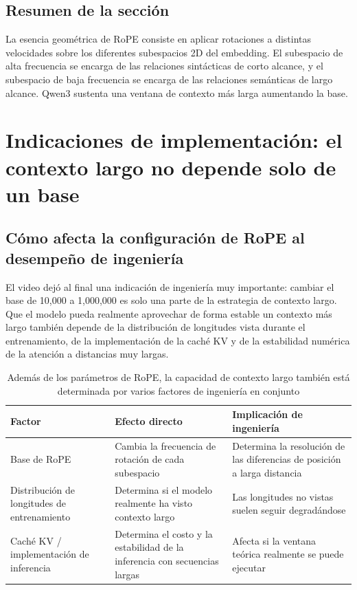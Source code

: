 \documentclass[a4paper]{article}
\begin{document}
\subsection{Resumen de la sección}

La esencia geométrica de RoPE consiste en aplicar rotaciones a distintas velocidades sobre los diferentes subespacios 2D del embedding. El subespacio de alta frecuencia se encarga de las relaciones sintácticas de corto alcance, y el subespacio de baja frecuencia se encarga de las relaciones semánticas de largo alcance. Qwen3 sustenta una ventana de contexto más larga aumentando la base.
\section{Indicaciones de implementación: el contexto largo no depende solo de un base}
\subsection{Cómo afecta la configuración de RoPE al desempeño de ingeniería}
El video dejó al final una indicación de ingeniería muy importante: cambiar el base de 10,000 a 1,000,000 es solo una parte de la estrategia de contexto largo. Que el modelo pueda realmente aprovechar de forma estable un contexto más largo también depende de la distribución de longitudes vista durante el entrenamiento, de la implementación de la caché KV y de la estabilidad numérica de la atención a distancias muy largas.

\begin{table}[H]
\centering
\begin{tabular}{p{3.2cm}p{4.6cm}p{4.6cm}}
\toprule
Factor & Efecto directo & Implicación de ingeniería \\
\midrule
Base de RoPE & Cambia la frecuencia de rotación de cada subespacio & Determina la resolución de las diferencias de posición a larga distancia \\
Distribución de longitudes de entrenamiento & Determina si el modelo realmente ha visto contexto largo & Las longitudes no vistas suelen seguir degradándose \\
Caché KV / implementación de inferencia & Determina el costo y la estabilidad de la inferencia con secuencias largas & Afecta si la ventana teórica realmente se puede ejecutar \\
\bottomrule
\end{tabular}
\caption{Además de los parámetros de RoPE, la capacidad de contexto largo también está determinada por varios factores de ingeniería en conjunto}
\end{table}
\end{document}
